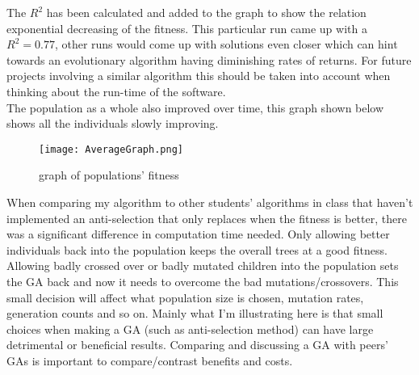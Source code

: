 \documentclass[twoside]{article}
\begin{document}
\begin{multicols}{2}
The $R^2$ has been calculated and added to the graph to show the relation exponential decreasing of the fitness. This particular run came up with a $R^2=0.77$, other runs would come up with solutions even closer which can hint towards an evolutionary algorithm having diminishing rates of returns. For future projects involving a similar algorithm this should be taken into account when thinking about the run-time of the software.\\
The population as a whole also improved over time, this graph shown below shows all the individuals slowly improving.\\

\begin{figure}[H]
\label{fig:pop}
		\texttt{[image: AverageGraph.png]}
		\caption{graph of populations' fitness}
\end{figure}

When comparing my algorithm to other students' algorithms in class that haven't implemented an anti-selection that only replaces when the fitness is better, there was a significant difference in computation time needed. Only allowing better individuals back into the population keeps the overall trees at a good fitness. Allowing badly crossed over or badly mutated children into the population sets the GA back and now it needs to overcome the bad mutations/crossovers. This small decision will affect what population size is chosen, mutation rates, generation counts and so on. Mainly what I'm illustrating here is that small choices when making a GA (such as anti-selection method) can have large detrimental or beneficial results. Comparing and discussing a GA with peers' GAs is important to compare/contrast benefits and costs.



\end{multicols}
\end{document}

